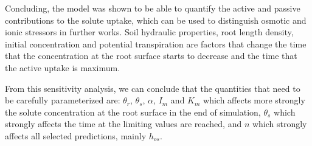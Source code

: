 {\tred Concluding, the model was shown to be able to quantify the active and passive contributions to the solute uptake, which can be used to distinguish osmotic and ionic stressors in further works.
Soil hydraulic properties, root length density, initial concentration and potential transpiration are factors that change the time that the concentration at the root surface starts to decrease and the time that the active uptake is maximum. 
}

{\tred From this sensitivity analysis, we can conclude that the quantities that need to be carefully parameterized are: $\theta_r$, $\theta_s$, $\alpha$, $I_m$ and $K_m$ which affects more strongly the solute concentration at the root surface in the end of simulation, $\theta_s$ which strongly affects the time at the limiting values are reached, and $n$ which strongly affects all selected predictions, mainly $h_{os}$. 
}


